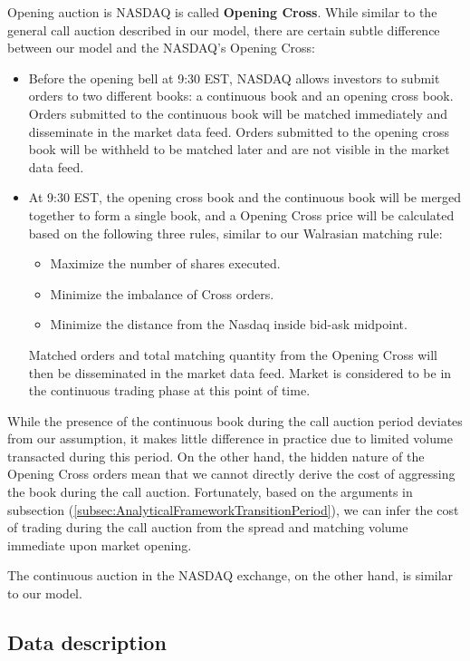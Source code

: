 \documentclass{article}
\begin{document}
Opening auction is NASDAQ is called \textbf{Opening Cross}. While similar to the general call auction described in our model, there are certain subtle difference between our model and the NASDAQ's Opening Cross:
\begin{itemize}
  \item Before the opening bell at 9:30 EST, NASDAQ allows investors to submit orders to two different books: a continuous book and an opening cross book. Orders submitted to the continuous book will be matched immediately and disseminate in the market data feed. Orders submitted to the opening cross book will be withheld to be matched later and are not visible in the market data feed.
  \item At 9:30 EST, the opening cross book and the continuous book will be merged together to form a single book, and a Opening Cross price will be calculated based on the following three rules, similar to our Walrasian matching rule:
        \begin{itemize}
          \item Maximize the number of shares executed.
          \item Minimize the imbalance of Cross orders.
          \item Minimize the distance from the Nasdaq inside bid-ask midpoint.
        \end{itemize}
        Matched orders and total matching quantity from the Opening Cross will then be disseminated in the market data feed. Market is considered to be in the continuous trading phase at this point of time.
\end{itemize}

While the presence of the continuous book during the call auction period deviates from our assumption, it makes little difference in practice due to limited volume transacted during this period. On the other hand, the hidden nature of the Opening Cross orders mean that we cannot directly derive the cost of aggressing the book during the call auction. Fortunately, based on the arguments in subsection (\ref{subsec:AnalyticalFrameworkTransitionPeriod}), we can infer the cost of trading during the call auction from the spread and matching volume immediate upon market opening.

The continuous auction in the NASDAQ exchange, on the other hand, is similar to our model.

\subsection{Data description}
\end{document}
